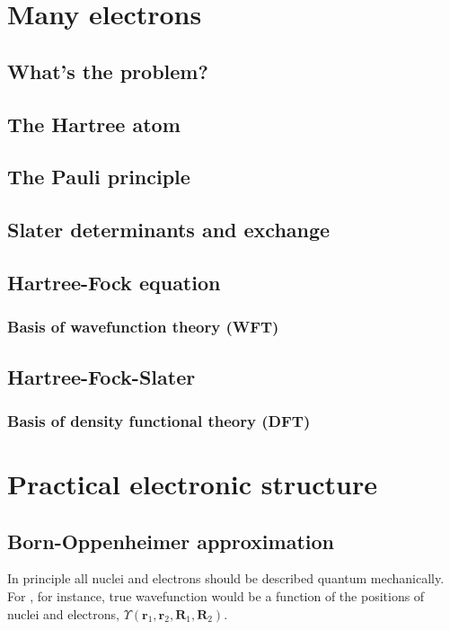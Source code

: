 \documentclass[11pt]{article}
\begin{document}
\section{Many electrons}
\label{sec-4}
\subsection{What's the problem?}
\label{sec-4-1}
\subsection{The Hartree atom}
\label{sec-4-2}
\subsection{The Pauli principle}
\label{sec-4-3}
\subsection{Slater determinants and exchange}
\label{sec-4-4}
\subsection{Hartree-Fock equation}
\label{sec-4-5}
\subsubsection{Basis of wavefunction theory (WFT)}
\label{sec-4-5-1}
\subsection{Hartree-Fock-Slater}
\label{sec-4-6}
\subsubsection{Basis of density functional theory (DFT)}
\label{sec-4-6-1}
\newpage
\section{Practical electronic structure}
\label{sec-5}
\subsection{Born-Oppenheimer approximation}
\label{sec-5-1}
In principle all nuclei and electrons should be described quantum mechanically.  For ,
for instance, true wavefunction would be a function of the positions of nuclei and
electrons, $\Upsilon(\mathbf{r}_{1}, \mathbf{r}_{2},\mathbf{R}_{1},\mathbf{R}_{2})$.
\end{document}
